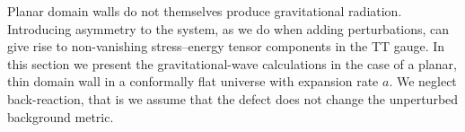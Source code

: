 



\newcommand{\ah}{\ALIASah}          %
\newcommand{\Src}{f}                %
\newcommand{\polplus}{\ALIASpolplus}
\newcommand{\polcross}{\ALIASpolcross}
 






Planar domain walls do not themselves produce gravitational radiation. Introducing asymmetry to the system, as we do when adding perturbations, can give rise to non-vanishing stress--energy tensor components in the TT gauge. %
In this section we present the gravitational-wave calculations in the case of a planar, thin domain wall in a conformally flat universe with expansion rate $a$. %
We neglect back-reaction, that is we assume that the defect does not change the unperturbed background metric. 










